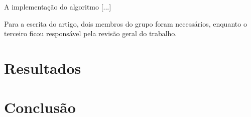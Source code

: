 \documentclass[12pt]{article}
\begin{document}
A implementação do algoritmo [...]

Para a escrita do artigo, dois membros do grupo foram necessários, enquanto o terceiro ficou responsável pela revisão geral do trabalho. 



\section{Resultados}

\section{Conclusão}




\end{document}
